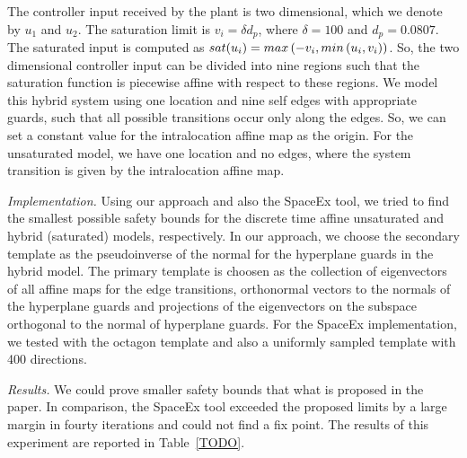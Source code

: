 The controller input received by the plant is two dimensional, which
we denote by $u_1$ and $u_2$.  The saturation limit is $v_i=\delta
d_p$, where $\delta=100$ and $d_p=0.0807$.  The saturated input is
computed as $sat(u_i) = max\left(-v_i,min\left(u_i,v_i\right)\right)$.  So, the
two dimensional controller input can be divided into nine regions such
that the saturation function is piecewise affine with respect to these
regions.  We model this hybrid system using one location and nine self
edges with appropriate guards, such that all possible transitions
occur only along the edges.  So, we can set a constant value for the
intralocation affine map as the origin.  For the unsaturated model, we
have one location and no edges, where the system transition is given
by the intralocation affine map.
\vspace{0.2em}

\emph{Implementation.}  Using our approach and also the SpaceEx tool,
we tried to find the smallest possible safety bounds for the discrete
time affine unsaturated and hybrid (saturated) models, respectively.
In our approach, we choose the secondary template as the pseudoinverse
of the normal for the hyperplane guards in the hybrid model.  The
primary template is choosen as the collection of eigenvectors of all
affine maps for the edge transitions, orthonormal vectors to the
normals of the hyperplane guards and projections of the eigenvectors
on the subspace orthogonal to the normal of hyperplane guards.  For
the SpaceEx implementation, we tested with the octagon template and
also a uniformly sampled template with 400 directions.

\emph{Results.}  We could prove smaller safety bounds that what is
proposed in the paper.  In comparison, the SpaceEx tool exceeded the
proposed limits by a large margin in fourty iterations and could not
find a fix point.  The results of this experiment are reported in
Table~\ref{TODO}.

